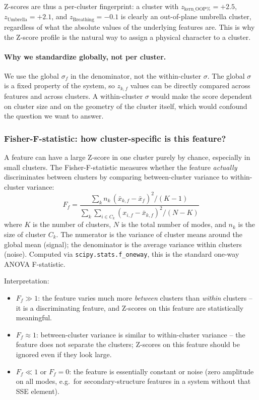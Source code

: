 \documentclass[11pt,a4paper,twoside]{article}
\theoremstyle{remark}
\begin{document}
Z-scores are thus a per-cluster fingerprint: a cluster with
$z_{\text{kern\_OOP}\%} = +2.5$,
$z_{\text{Umbrella}} = +2.1$, and
$z_{\text{Breathing}} = -0.1$ is clearly an out-of-plane umbrella
cluster, regardless of what the absolute values of the underlying
features are. This is why the Z-score profile is the natural way
to assign a physical character to a cluster.

\paragraph{Why we standardize globally, not per cluster.}
We use the global $\sigma_f$ in the denominator, not the
within-cluster $\sigma$. The global $\sigma$ is a fixed property
of the system, so $z_{k,f}$ values can be directly compared across
features and across clusters. A within-cluster $\sigma$ would make
the score dependent on cluster size and on the geometry of the
cluster itself, which would confound the question we want to
answer.

\subsubsection*{Fisher-F-statistic: how cluster-specific is this feature?}

A feature can have a large Z-score in one cluster purely by
chance, especially in small clusters. The Fisher-F-statistic
measures whether the feature \emph{actually} discriminates between
clusters by comparing between-cluster variance to within-cluster
variance:
\begin{equation}
  F_f = \frac{
    \sum_k n_k\,(\bar{x}_{k,f} - \bar{x}_f)^2 / (K - 1)
  }{
    \sum_k \sum_{i \in C_k} (x_{i,f} - \bar{x}_{k,f})^2 / (N - K)
  }
\end{equation}
where $K$ is the number of clusters, $N$ is the total number of
modes, and $n_k$ is the size of cluster $C_k$. The numerator is
the variance of cluster means around the global mean (signal); the
denominator is the average variance within clusters (noise).
Computed via \texttt{scipy.stats.f\_oneway}, this is the standard
one-way ANOVA F-statistic.

Interpretation:
\begin{itemize}\setlength{\itemsep}{0pt}
  \item $F_f \gg 1$: the feature varies much more \emph{between}
        clusters than \emph{within} clusters -- it is a
        discriminating feature, and Z-scores on this feature are
        statistically meaningful.
  \item $F_f \approx 1$: between-cluster variance is similar to
        within-cluster variance -- the feature does not separate
        the clusters; Z-scores on this feature should be ignored
        even if they look large.
  \item $F_f \ll 1$ or $F_f = 0$: the feature is essentially
        constant or noise (zero amplitude on all modes, e.g.\ for
        secondary-structure features in a system without that
        SSE element).
\end{itemize}
\end{document}
